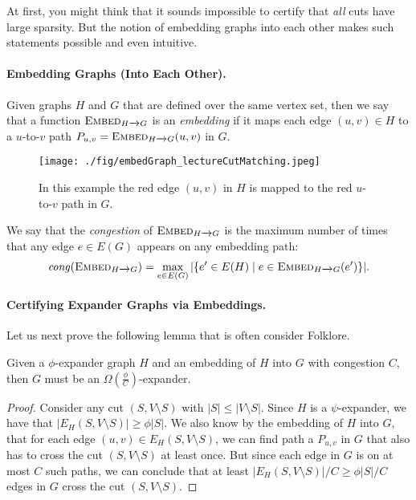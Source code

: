 At first, you might think that it sounds impossible to certify that \emph{all} cuts have large sparsity. But the notion of embedding graphs into each other makes such statements possible and even intuitive.

\paragraph{Embedding Graphs (Into Each Other).} Given graphs $H$ and $G$ that are defined over the same vertex set, then we say that a function $\textsc{Embed}_{H \xrightarrow{} G}$ is an \emph{embedding} if it maps each edge $(u,v) \in H$ to a $u$-to-$v$ path $P_{u,v} = \textsc{Embed}_{H \xrightarrow{} G}(u,v)$ in $G$. 
\begin{figure}[!ht]
    \centering
    \texttt{[image: ./fig/embedGraph\_lectureCutMatching.jpeg]}
    \caption{In this example the red edge $(u,v)$ in $H$ is mapped to the red $u$-to-$v$ path in $G$.}
    \label{fig:my_label}
\end{figure}

We say that the \emph{congestion} of $\textsc{Embed}_{H \xrightarrow{} G}$ is the maximum number of times that any edge $e \in E(G)$ appears on any embedding path: \[
\mathit{cong}(\textsc{Embed}_{H \xrightarrow{} G}) = \max_{e \in E(G)} |\{ e' \in E(H) \;|\; e \in \textsc{Embed}_{H \xrightarrow{} G}(e') \}|.
\]

\paragraph{Certifying Expander Graphs via Embeddings.} Let us next prove the following lemma that is often consider Folklore.

\begin{lemma}\label{lma:folklore_embedding}
Given a $\phi$-expander graph $H$ and an embedding of $H$ into $G$ with congestion $C$, then $G$ must be an $\Omega\left(\frac{\phi}{C}\right)$-expander. 
\end{lemma}
\begin{proof}
Consider any cut $(S, V \setminus S)$ with $|S| \leq |V \setminus S|$. Since $H$ is a $\psi$-expander, we have that $|E_H(S, V \setminus S)| \geq \phi|S|$. We also know by the embedding of $H$ into $G$, that for each edge $(u,v) \in E_H(S, V \setminus S)$, we can find path a $P_{u,v}$ in $G$ that also has to cross the cut $(S, V \setminus S)$ at least once. But since each edge in $G$ is on at most $C$ such paths, we can conclude that at least $|E_H(S, V \setminus S)|/ C \geq \phi |S|/C$ edges in $G$ cross the cut $(S, V \setminus S)$. 
\end{proof}

